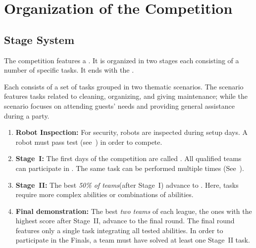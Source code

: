 \section{Organization of the Competition}
\label{sec:procedure_during_competition}

\subsection{Stage System}\label{rule:stages}

The competition features a . It is organized in two stages each consisting of a number of specific tasks. It ends with the .

Each  consists of a set of tasks grouped in two thematic scenarios.
The  scenario features tasks related to cleaning, organizing, and giving maintenance; while the  scenario focuses on attending guests' needs and providing general assistance during a party.

\begin{enumerate}
	\item \textbf{Robot Inspection:} For security, robots are inspected during setup days.
  A robot must pass  test (see~) in order to compete.

	\item \textbf{Stage~I:} The first days of the competition are called .
	All qualified teams can participate in .
	The same task can be performed multiple times (See~).

	\item \textbf{Stage~II:} The best \emph{50\% of teams}\footnotemark (after Stage~I) advance to .
	Here, tasks require more complex abilities or combinations of abilities.
	
	\item \textbf{Final demonstration:} The best \emph{two teams} of each league, the ones with the highest score after Stage~II, advance to the final round.
	The final round features only a single task integrating all tested abilities.
	In order to participate in the Finals, a team must have solved at least one Stage~II task.
\end{enumerate}

